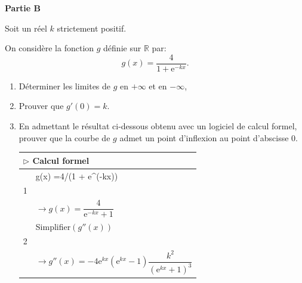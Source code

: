 \documentclass[10pt]{article}
\providecommand{\R}{\mathbb{R}}
\begin{document}
\medskip

\textbf{Partie B}

\medskip

Soit un réel $k$ strictement positif.

On considère la fonction $g$ définie sur $\R$ par:
\[g(x) = \dfrac{4}{1 + \text{e}^{- kx}}.\]

\smallskip

\begin{enumerate}
\item  Déterminer les limites de $g$ en $+ \infty$ et en $-\infty$,
\item  Prouver que $g'(0) = k$.
\item  En admettant le résultat ci-dessous obtenu avec un logiciel de calcul formel,
prouver que la courbe de $g$ admet un point d'inflexion au point d'abscisse 0.
\begin{center}
\begin{tabular}{|c l|}\hline
\multicolumn{2}{|l|}{$\triangleright$ Calcul formel}\\ \hline
&g(x) =4/(1 + e{}\^{}(-kx))\\
1&\\
&$\to g(x) = \dfrac{4}{\text{e}^{-kx} + 1}$\\ \hline
&Simplifier$(g''(x))$\\
2&\\
&$\to g''(x) = - 4\text{e}^{kx}\left(\text{e}^{kx} - 1\right)\dfrac{k^2}{\left(\text{e}^{kx} + 1 \right)^3}$\\ \hline
\end{tabular}
\end{center}
\end{enumerate}

\bigskip
\end{document}
